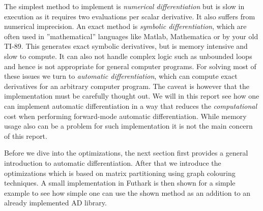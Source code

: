 	The simplest method to implement is \textit{numerical differentiation}
	but is slow in execution as it requires two evaluations per scalar derivative.
	It also suffers from numerical imprecision. An exact method is
	\textit{symbolic differentiation}, which are often used in  ''mathematical''
	languages
	like Matlab, Mathematica or by your old TI-89.  This generates exact symbolic
	derivatives, but
	is memory intensive and slow to compute. It can also not handle
	complex logic such as unbounded loops and hence is not appropriate for general
	computer programs.
	For solving most of these issues we turn to \textit{automatic differentiation},
	which can
	compute exact derivatives for an arbitrary computer program. The caveat is
	however
	that the implementation must be carefully thought out. We will in this report
	see how one can implement automatic differentiation in a way that reduces
	the \emph{computational} cost when performing forward-mode automatic differentiation. 
	While memory usage also can be a problem for such implementation it is not the main 
	concern of this report. \newline
	
	
	 
	Before we dive into the optimizations, the next section first provides a general introduction to 
	automatic differentiation. After that we introduce the optimizations which is 
	based on matrix partitioning using graph colouring techniques. A small implementation
	in Futhark is then shown for a simple example to see how simple one can use the shown method
	as an addition to an already implemented AD library. 
	


